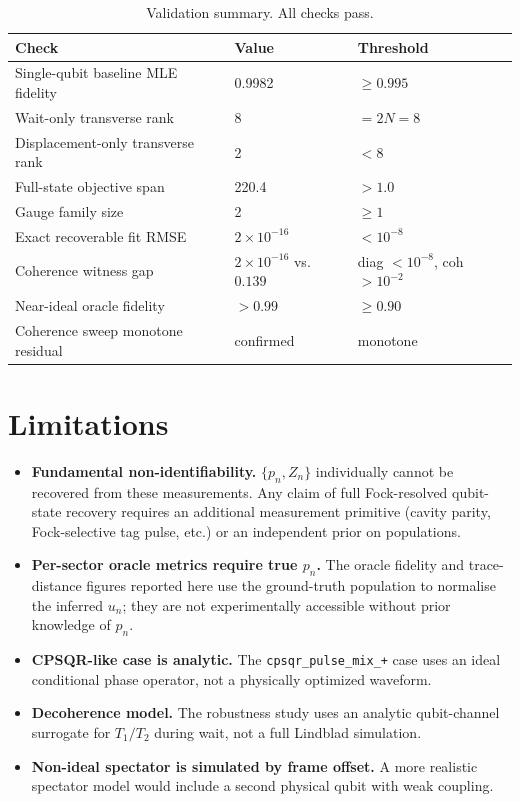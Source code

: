 \documentclass[11pt,onecolumn]{article}
\begin{document}
\begin{table}[H]
\centering
\begin{tabular}{lll}
\toprule
Check & Value & Threshold\\
\midrule
Single-qubit baseline MLE fidelity & 0.9982 & $\geq0.995$\\
Wait-only transverse rank & 8 & $=2N=8$\\
Displacement-only transverse rank & 2 & $<8$\\
Full-state objective span & 220.4 & $>1.0$\\
Gauge family size & 2 & $\geq1$\\
Exact recoverable fit RMSE & $2\times10^{-16}$ & $<10^{-8}$\\
Coherence witness gap & $2\times10^{-16}$ vs.\ $0.139$ & diag $<10^{-8}$, coh $>10^{-2}$\\
Near-ideal oracle fidelity & $>0.99$ & $\geq0.90$\\
Coherence sweep monotone residual & confirmed & monotone\\
\bottomrule
\end{tabular}
\caption{Validation summary.  All checks pass.}
\label{tab:validation}
\end{table}

\section{Limitations}

\begin{itemize}
\item \textbf{Fundamental non-identifiability.}  $\{p_n, Z_n\}$ individually cannot
  be recovered from these measurements.  Any claim of full Fock-resolved qubit-state
  recovery requires an additional measurement primitive (cavity parity, Fock-selective
  tag pulse, etc.) or an independent prior on populations.

\item \textbf{Per-sector oracle metrics require true $p_n$.}  The oracle fidelity and
  trace-distance figures reported here use the ground-truth population to normalise
  the inferred $u_n$; they are not experimentally accessible without prior knowledge
  of $p_n$.

\item \textbf{CPSQR-like case is analytic.}  The \texttt{cpsqr\_pulse\_mix\_+} case
  uses an ideal conditional phase operator, not a physically optimized waveform.

\item \textbf{Decoherence model.}  The robustness study uses an analytic qubit-channel
  surrogate for $T_1/T_2$ during wait, not a full Lindblad simulation.

\item \textbf{Non-ideal spectator is simulated by frame offset.}  A more realistic
  spectator model would include a second physical qubit with weak coupling.
\end{itemize}
\end{document}
